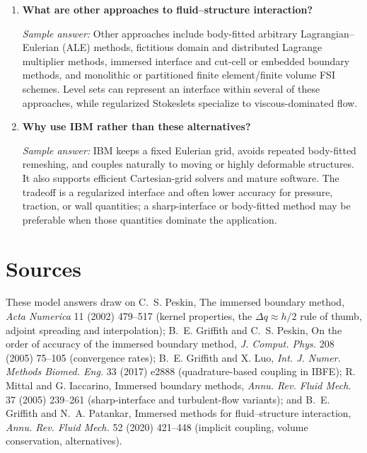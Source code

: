 \documentclass[11pt]{article}
\begin{document}
\begin{enumerate}[label=\arabic*.]

\item \textbf{What are other approaches to fluid--structure interaction?}

\textit{Sample answer:}  
Other approaches include body-fitted arbitrary Lagrangian--Eulerian (ALE) methods, fictitious domain and distributed Lagrange multiplier methods, immersed interface and cut-cell or embedded boundary methods, and monolithic or partitioned finite element/finite volume FSI schemes. Level sets can represent an interface within several of these approaches, while regularized Stokeslets specialize to viscous-dominated flow.

\item \textbf{Why use IBM rather than these alternatives?}

\textit{Sample answer:}  
IBM keeps a fixed Eulerian grid, avoids repeated body-fitted remeshing, and couples naturally to moving or highly deformable structures. It also supports efficient Cartesian-grid solvers and mature software. The tradeoff is a regularized interface and often lower accuracy for pressure, traction, or wall quantities; a sharp-interface or body-fitted method may be preferable when those quantities dominate the application.

\end{enumerate}

\section*{Sources}
\small
These model answers draw on C.~S. Peskin, The immersed boundary method, \emph{Acta Numerica} 11 (2002) 479--517
(kernel properties, the $\Delta q\approx h/2$ rule of thumb, adjoint spreading and interpolation);
B.~E. Griffith and C.~S. Peskin, On the order of accuracy of the immersed boundary method,
\emph{J. Comput. Phys.} 208 (2005) 75--105 (convergence rates);
B.~E. Griffith and X. Luo, \emph{Int. J. Numer. Methods Biomed. Eng.} 33 (2017) e2888 (quadrature-based coupling in IBFE);
R. Mittal and G. Iaccarino, Immersed boundary methods, \emph{Annu. Rev. Fluid Mech.} 37 (2005) 239--261
(sharp-interface and turbulent-flow variants); and
B.~E. Griffith and N.~A. Patankar, Immersed methods for fluid--structure interaction,
\emph{Annu. Rev. Fluid Mech.} 52 (2020) 421--448 (implicit coupling, volume conservation, alternatives).
\end{document}
